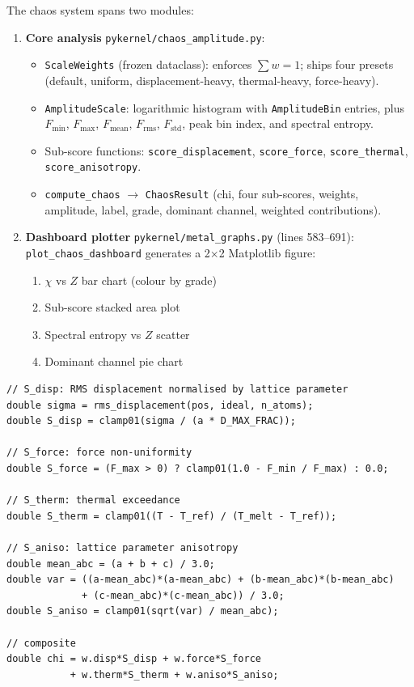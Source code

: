 \documentclass[11pt,a4paper]{article}
\begin{document}
The chaos system spans two modules:

\begin{enumerate}
  \item \textbf{Core analysis} \texttt{pykernel/chaos\_amplitude.py}:
    \begin{itemize}
      \item \texttt{ScaleWeights} (frozen dataclass): enforces $\sum w = 1$;
            ships four presets (default, uniform, displacement-heavy,
            thermal-heavy, force-heavy).
      \item \texttt{AmplitudeScale}: logarithmic histogram with
            \texttt{AmplitudeBin} entries, plus $F_{\min}$, $F_{\max}$,
            $F_{\text{mean}}$, $F_{\text{rms}}$, $F_{\text{std}}$,
            peak bin index, and spectral entropy.
      \item Sub-score functions: \texttt{score\_displacement},
            \texttt{score\_force}, \texttt{score\_thermal},
            \texttt{score\_anisotropy}.
      \item \texttt{compute\_chaos} $\rightarrow$ \texttt{ChaosResult}
            (chi, four sub-scores, weights, amplitude, label, grade,
            dominant channel, weighted contributions).
    \end{itemize}
  \item \textbf{Dashboard plotter} \texttt{pykernel/metal\_graphs.py}
        (lines 583--691): \texttt{plot\_chaos\_dashboard} generates
        a 2$\times$2 Matplotlib figure:
    \begin{enumerate}
      \item $\chi$ vs $Z$ bar chart (colour by grade)
      \item Sub-score stacked area plot
      \item Spectral entropy vs $Z$ scatter
      \item Dominant channel pie chart
    \end{enumerate}
\end{enumerate}

\begin{lstlisting}[style=cpp,title={\textbf{C++ chaos sub-score concept (mirrored in Python)}}]
// S_disp: RMS displacement normalised by lattice parameter
double sigma = rms_displacement(pos, ideal, n_atoms);
double S_disp = clamp01(sigma / (a * D_MAX_FRAC));

// S_force: force non-uniformity
double S_force = (F_max > 0) ? clamp01(1.0 - F_min / F_max) : 0.0;

// S_therm: thermal exceedance
double S_therm = clamp01((T - T_ref) / (T_melt - T_ref));

// S_aniso: lattice parameter anisotropy
double mean_abc = (a + b + c) / 3.0;
double var = ((a-mean_abc)*(a-mean_abc) + (b-mean_abc)*(b-mean_abc)
             + (c-mean_abc)*(c-mean_abc)) / 3.0;
double S_aniso = clamp01(sqrt(var) / mean_abc);

// composite
double chi = w.disp*S_disp + w.force*S_force
           + w.therm*S_therm + w.aniso*S_aniso;
\end{lstlisting}
\end{document}
